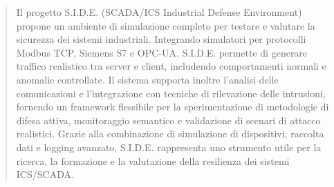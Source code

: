 \documentclass[a4paper,12pt]{report}
\begin{document}


\begin{abstract}
Il progetto S.I.D.E. (SCADA/ICS Industrial Defense Environment) propone un ambiente di simulazione completo per testare e valutare la sicurezza dei sistemi industriali.  
Integrando simulatori per protocolli Modbus TCP, Siemens S7 e OPC-UA.  S.I.D.E. permette di generare traffico realistico tra server e client, includendo comportamenti normali e anomalie controllate.  
Il sistema supporta inoltre l’analisi delle comunicazioni e l’integrazione con tecniche di rilevazione delle intrusioni, fornendo un framework flessibile per la sperimentazione di metodologie di difesa attiva, monitoraggio semantico e validazione di scenari di attacco realistici.  
Grazie alla combinazione di simulazione di dispositivi, raccolta dati e logging avanzato, S.I.D.E. rappresenta uno strumento utile per la ricerca, la formazione e la valutazione della resilienza dei sistemi ICS/SCADA.
\end{abstract}

\tableofcontents
\newpage













\printbibliography
\end{document}
